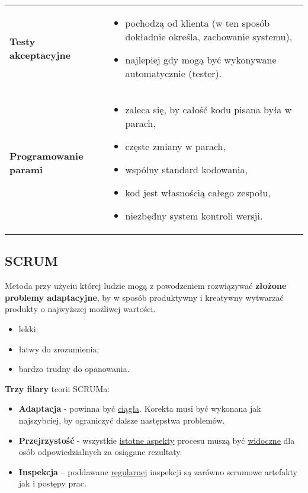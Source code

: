 \documentclass[a4paper]{article}
\begin{document}
\begin{table}[H]
\begin{center}
\begin{tabular}{ p{8cm} p{8cm} }
                \cmidrule(r){1-1}\cmidrule(l){2-2}
                \textbf{Testy akceptacyjne}
                &
                \begin{itemize}
                    \item pochodzą od klienta (w ten sposób dokładnie określa,
                    zachowanie systemu),
                    \item najlepiej gdy mogą być wykonywane automatycznie (tester).
                \end{itemize}
                \\

                \cmidrule(r){1-1}\cmidrule(l){2-2}
                \textbf{Programowanie parami}
                &
                \begin{itemize}
                    \item zaleca się, by całość kodu pisana była w parach,
                    \item częste zmiany w parach,
                    \item wspólny standard kodowania,
                    \item kod jest własnością całego zespołu,
                    \item niezbędny system kontroli wersji.
                \end{itemize}
                \\
            \end{tabular}
        \end{center}
    \end{table}

    \subsection{SCRUM}
    Metoda przy użyciu której ludzie mogą z powodzeniem rozwiązywać \textbf{złożone problemy
    adaptacyjne}, by w sposób produktywny i kreatywny wytwarzać produkty o najwyższej możliwej wartości.
    \begin{itemize}
        \item lekki;
        \item łatwy do zrozumienia;
        \item bardzo trudny do opanowania.
    \end{itemize}

    \textbf{Trzy filary} teorii SCRUMa:
    \begin{itemize}
        \item \textbf{Adaptacja} - powinna być \underline{ciągła}. Korekta musi być
        wykonana jak najszybciej, by ograniczyć dalsze następstwa problemów.
        \item \textbf{Przejrzystość} - wszystkie \underline{istotne aspekty} procesu
        muszą być \underline{widoczne} dla osób odpowiedzialnych za osiągane rezultaty.
        \item \textbf{Inspekcja} – poddawane \underline{regularnej} inspekcji są zarówno scrumowe
        artefakty jak i postępy prac.
    \end{itemize}
\end{document}
